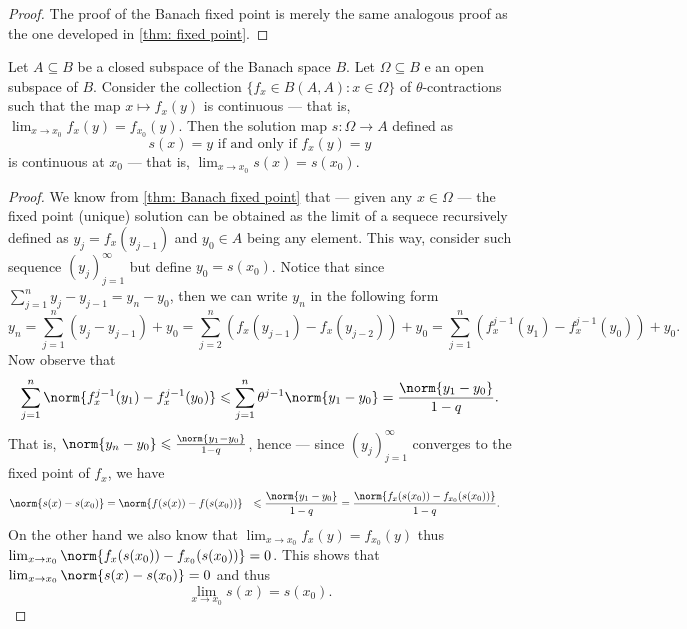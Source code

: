 \begin{proof}
  The proof of the Banach fixed point is merely the same analogous proof as the
  one developed in \cref{thm: fixed point}.
\end{proof}

\begin{proposition}
\label{prop:fixed-point-stability}
Let \(A \subseteq B\) be a closed subspace of the Banach space \(B\). Let \(\Omega \subseteq B\) e
an open subspace of \(B\). Consider the collection \(\{f_{x} \in B(A, A) : x \in
\Omega\}\)   of \(\theta\)-contractions such that the map \(x \mapsto f_x(y)\) is continuous ---
that is, \(\lim_{x\to x_0} f_x(y) = f_{x_0}(y)\).
Then the solution map \(s: \Omega \to A\) defined as
\[
s(x) = y \text{ if and only if } f_x(y) = y
\]
is continuous at \(x_0\) --- that is, \(\lim_{x \to x_0} s(x) = s(x_0)\).
\end{proposition}

\begin{proof}
  We know from \cref{thm: Banach fixed point} that --- given any \(x \in \Omega\) ---
  the fixed point (unique) solution can be obtained as the limit of
  a sequece recursively defined as \(y_j = f_x(y_{j-1})\) and \(y_0 \in A\) being
  any element. This way, consider such sequence \((y_j)_{j=1}^{\infty}\) but define
  \(y_0 = s(x_0)\). Notice that since \(\sum_{j=1}^n y_j - y_{j-1} = y_n - y_0\),
  then we can write \(y_n\) in the following form
  \[
    y_n = \sum_{j=1}^n (y_j - y_{j-1}) + y_0
    = \sum_{j=2}^n (f_x(y_{j-1}) - f_x(y_{j-2}))
    + y_0 = \sum_{j=1}^n \left(f_x^{j-1}(y_1) - f_x^{j-1}(y_0)\right) + y_{0}.
  \]
  Now observe that
  \[
    \sum_{j=1}^n \norm{f_x^{j-1}(y_1) - f_x^{j-1}(y_0)}
    \leq \sum_{j=1}^n \theta^{j-1} \norm{y_1 -
    y_0} = \frac{\norm{y_1 - y_0}}{1 - q}.
  \]
  That is, \(\norm{y_n - y_0} \leq \frac{\norm{y_1 - y_0}}{1 - q}\), hence --- since
  \((y_j)_{j=1}^{\infty}\) converges to the fixed point of \(f_x\), we have
  \begin{align*}
    \norm{s(x) - s(x_0)} &= \norm{f(s(x)) - f(s(x_0))}
    &\leq \frac{\norm{y_1 - y_0}}{1-q}
    &= \frac{\norm{f_x(s(x_0)) - f_{x_0}(s(x_0))}}{1 - q}.
  \end{align*}
  On the other hand we also know that \(\lim_{x \to x_0}f_x(y) = f_{x_0}(y)\) thus
  \(\lim_{x \to x_0} \norm{f_x(s(x_0)) - f_{x_0}(s(x_0))} = 0\). This shows that
  \(\lim_{x \to x_0} \norm{s(x) - s(x_0)} = 0\) and thus
  \[
    \lim_{x \to x_0} s(x) = s(x_0).
  \]
\end{proof}

